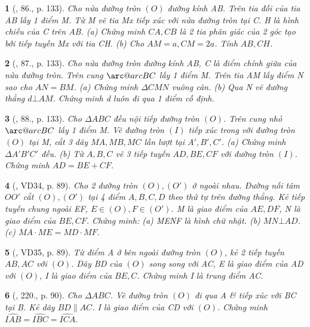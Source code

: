 \documentclass{article}
\makeatletter
\newcommand{\arc@char}{{\usefont{U}{tipa}{m}{n}\symbol{62}}}%
\newcommand{\arc}[1]{\mathpalette\arc@arc{#1}}
\newcommand{\arc@arc}[2]{%
	\sbox0{$\m@th#1#2$}%
	\vbox{
		\hbox{\resizebox{\wd0}{\height}{\arc@char}}
		\nointerlineskip
		\box0
	}%
}
\newtheorem{baitoan}{}
\makeatother
\begin{document}
\begin{baitoan}[\cite{Tuyen_Toan_9_old}, 86., p. 133]
	Cho nửa đường tròn $(O)$ đường kính AB. Trên tia đối của tia AB lấy 1 điểm M. Từ M vẽ tia Mx tiếp xúc với nửa đường tròn tại C. H là hình chiếu của C trên AB. (a) Chứng minh $CA,CB$ là 2 tia phân giác của 2 góc tạo bởi tiếp tuyến Mx với tia CH. (b) Cho $AM = a,CM = 2a$. Tính $AB,CH$.
\end{baitoan}

\begin{baitoan}[\cite{Tuyen_Toan_9_old}, 87., p. 133]
	Cho nửa đường tròn đường kính AB, C là điểm chính giữa của nửa đường tròn. Trên cung $\arc{BC}$ lấy 1 điểm M. Trên tia AM lấy điểm N sao cho $AN = BM$. (a) Chứng minh $\Delta CMN$ vuông cân. (b) Qua N vẽ đường thẳng $d\bot AM$. Chứng minh d luôn đi qua 1 điểm cố định.
\end{baitoan}

\begin{baitoan}[\cite{Tuyen_Toan_9_old}, 88., p. 133]
	Cho $\Delta ABC$ đều nội tiếp đường tròn $(O)$. Trên cung nhỏ $\arc{BC}$ lấy 1 điểm M. Vẽ đường tròn $(I)$ tiếp xúc trong với đường tròn $(O)$ tại M, cắt 3 dây $MA,MB,MC$ lần lượt tại $A',B',C'$. (a) Chứng minh $\Delta A'B'C'$ đều. (b) Từ $A,B,C$ vẽ 3 tiếp tuyến $AD,BE,CF$ với đường tròn $(I)$. Chứng minh $AD = BE + CF$.
\end{baitoan}

\begin{baitoan}[\cite{Binh_Toan_9_tap_2}, VD34, p. 89]
	Cho 2 đường tròn $(O),(O')$ ở ngoài nhau. Đường nối tâm $OO'$ cắt $(O),(O')$ tại 4 điểm $A,B,C,D$ theo thứ tự trên đường thẳng. Kẻ tiếp tuyến chung ngoài EF, $E\in(O),F\in(O')$. M là giao điểm của $AE,DF$, N là giao điểm của $BE,CF$. Chứng minh: (a) MENF là hình chữ nhật. (b) $MN\bot AD$. (c) $MA\cdot ME = MD\cdot MF$.
\end{baitoan}

\begin{baitoan}[\cite{Binh_Toan_9_tap_2}, VD35, p. 89]
	Từ điểm A ở bên ngoài đường tròn $(O)$, kẻ 2 tiếp tuyến $AB,AC$ với $(O)$. Dây BD của $(O)$ song song với AC, E là giao điểm của AD với $(O)$, I là giao điểm của $BE,C$. Chứng minh I là trung điểm AC.
\end{baitoan}

\begin{baitoan}[\cite{Binh_Toan_9_tap_2}, 220., p. 90]
	Cho $\Delta ABC$. Vẽ đường tròn $(O)$ đi qua A \& tiếp xúc với BC tại B. Kẻ dây $BD\parallel AC$. I là giao điểm của CD với $(O)$. Chứng minh $\widehat{IAB} = \widehat{IBC} = \widehat{ICA}$.
\end{baitoan}
\end{document}

